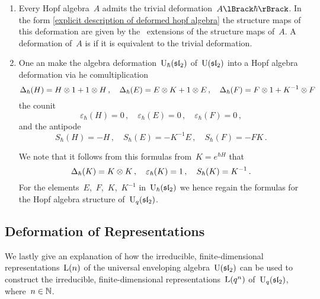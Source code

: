 \documentclass[a4paper, 11pt, oneside]{scrartcl}
\begin{document}
\begin{example}
  \leavevmode
  \begin{enumerate}
    \item
      Every Hopf algebra~$A$ admits the trivial deformation~$\power{A}{\hbar}$.
      In the form \cref{explicit description of deformed hopf algebra} the structure maps of this deformation are given by the~\linear{$\kfhbar$} extensions of the structure maps of~$A$.
      A deformation of~$A$ is  if it is equivalent to the trivial deformation.
    \item
      One an make the algebra deformation~$\operatorname{U}_{\hbar}(\mathfrak{sl}_2)$ of~$\operatorname{U}(\mathfrak{sl}_2)$ into a Hopf algebra deformation via he comultiplication
      \[
        \Delta_{\hbar}(H) = H \otimes 1 + 1 \otimes H \,,
        \quad
        \Delta_{\hbar}(E) = E \otimes K + 1 \otimes E \,,
        \quad
        \Delta_{\hbar}(F) = F \otimes 1 + K^{-1} \otimes F \,
      \]
      the counit
      \[
        \varepsilon_{\hbar}(H) = 0 \,,
        \quad
        \varepsilon_{\hbar}(E) = 0 \,,
        \quad
        \varepsilon_{\hbar}(F) = 0 \,,
      \]
      and the antipode
      \[
        S_{\hbar}(H) = - H \,,
        \quad
        S_{\hbar}(E) = - K^{-1} E \,,
        \quad
        S_{\hbar}(F) = - F K \,.
      \]

      We note that it follows from this formulas from~$K = e^{\hbar H}$ that
      \[
        \Delta_{\hbar}(K) = K \otimes K \,,
        \quad
        \varepsilon_{\hbar}(K) = 1 \,,
        \quad
        S_{\hbar}(K) = K^{-1} \,.
      \]
      For the elements~$E$,~$F$,~$K$,~$K^{-1}$ in~$\operatorname{U}_{\hbar}(\mathfrak{sl}_2)$ we hence regain the formulas for the Hopf algebra structure of~$\operatorname{U}_q(\mathfrak{sl}_2)$.
  \end{enumerate}
\end{example}



\subsection{Deformation of Representations}

We lastly give an explanation of how the irreducible, finite-dimensional representations~$\operatorname{L}(n)$ of the universal enveloping algebra~$\operatorname{U}(\mathfrak{sl}_2)$ can be used to construct the irreducible, finite-dimensional representations~$\operatorname{L}(q^n)$ of~$\operatorname{U}_q(\mathfrak{sl}_2)$, where~$n \in \mathbb{N}$.
\end{document}
